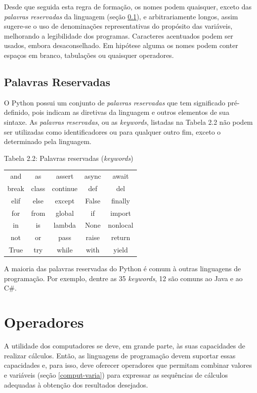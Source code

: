 \documentclass[
]{book}
\begin{document}
Desde que seguida esta regra de formação, os nomes podem quaisquer, exceto das \emph{palavras reservadas} da linguagem (seção \ref{comput-varia-reser}), e arbitrariamente longos, assim sugere-se o uso de denominações representativas do propósito das variáveis, melhorando a legibilidade dos programas. Caracteres acentuados podem ser usados, embora desaconselhado. Em hipótese alguma os nomes podem conter espaços em branco, tabulações ou quaisquer operadores.

\hypertarget{comput-varia-reser}{%
\subsection{Palavras Reservadas}\label{comput-varia-reser}}

O Python possui um conjunto de \emph{palavras reservadas} que tem significado pré-definido, pois indicam as diretivas da linguagem e outros elementos de sua sintaxe. As \emph{palavras reservadas}, ou as \emph{keywords}, listadas na Tabela 2.2 não podem ser utilizadas como identificadores ou para qualquer outro fim, exceto o determinado pela linguagem.

Tabela 2.2: Palavras reservadas (\emph{keywords})

\begin{longtable}[]{@{}ccccc@{}}
\toprule
& & & & \\
\midrule
\endhead
and & as & assert & async & await \\
break & class & continue & def & del \\
elif & else & except & False & finally \\
for & from & global & if & import \\
in & is & lambda & None & nonlocal \\
not & or & pass & raise & return \\
True & try & while & with & yield \\
\bottomrule
\end{longtable}

A maioria das palavras reservadas do Python é comum à outras linguagens de programação. Por exemplo, dentre as 35 \emph{keywords}, 12 são comuns ao Java e ao C\#.

\hypertarget{comput-opera}{%
\section{Operadores}\label{comput-opera}}

A utilidade dos computadores se deve, em grande parte, às suas capacidades de realizar cálculos. Então, as linguagens de programação devem suportar essas capacidades e, para isso, deve oferecer operadores que permitam combinar valores e variáveis (seção \ref{comput-varia}) para expressar as sequências de cálculos adequadas à obtenção dos resultados desejados.
\end{document}

